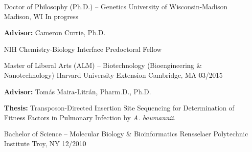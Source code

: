 

\begin{cventries}

\cventry
	{Doctor of Philosophy (Ph.D.) -- Genetics}
	{University of Wisconsin-Madison}
	{Madison, WI}
	{In progress}
	{
      \begin{cvitems}
      	\item {\textbf{Advisor:} Cameron Currie, Ph.D.}
      	\item {NIH Chemistry-Biology Interface Predoctoral Fellow}
      \end{cvitems}
    }

\cventry
	{Master of Liberal Arts (ALM) -- Biotechnology (Bioengineering \& Nanotechnology)}
	{Harvard University Extension}
	{Cambridge, MA}
	{03/2015}
	{
      \begin{cvitems}
      	\item {\textbf{Advisor:} Tom\'{a}s Maira-Litr\'{a}n, Pharm.D., Ph.D.}
      	\item {\textbf{Thesis:} Transposon-Directed Insertion Site Sequencing for Determination of Fitness Factors in Pulmonary Infection by \textit{A. baumannii}.}
      \end{cvitems}
    }
    
\cventry
	{Bachelor of Science -- Molecular Biology \& Bioinformatics}
	{Rensselaer Polytechnic Institute}
	{Troy, NY}
	{12/2010}
	{}
    
\end{cventries}


